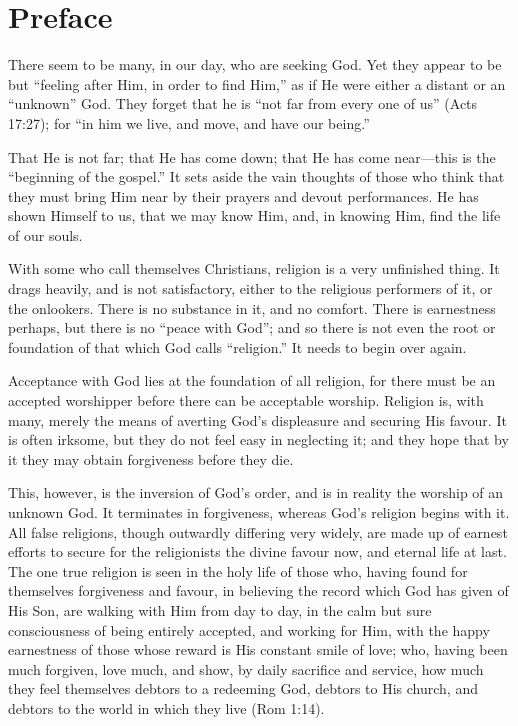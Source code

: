 \documentclass[
]{book}
\begin{document}
\clearpage
\setcounter{page}{1}

\hypertarget{preface}{%
\chapter*{Preface}\label{preface}}

There seem to be many, in our day, who are seeking God. Yet they appear to be but ``feeling after Him, in order to find Him,'' as if He were either a distant or an ``unknown'' God. They forget that he is ``not far from every one of us'' (Acts 17:27); for ``in him we live, and move, and have our being.''

That He is not far; that He has come down; that He has come near---this is the ``beginning of the gospel.'' It sets aside the vain thoughts of those who think that they must bring Him near by their prayers and devout performances. He has shown Himself to us, that we may know Him, and, in knowing Him, find the life of our souls.

With some who call themselves Christians, religion is a very unfinished thing. It drags heavily, and is not satisfactory, either to the religious performers of it, or the onlookers. There is no substance in it, and no comfort. There is earnestness perhaps, but there is no ``peace with God''; and so there is not even the root or foundation of that which God calls ``religion.'' It needs to begin over again.

Acceptance with God lies at the foundation of all religion, for there must be an accepted worshipper before there can be acceptable worship. Religion is, with many, merely the means of averting God's displeasure and securing His favour. It is often irksome, but they do not feel easy in neglecting it; and they hope that by it they may obtain forgiveness before they die.

This, however, is the inversion of God's order, and is in reality the worship of an unknown God. It terminates in forgiveness, whereas God's religion begins with it. All false religions, though outwardly differing very widely, are made up of earnest efforts to secure for the religionists the divine favour now, and eternal life at last. The one true religion is seen in the holy life of those who, having found for themselves forgiveness and favour, in believing the record which God has given of His Son, are walking with Him from day to day, in the calm but sure consciousness of being entirely accepted, and working for Him, with the happy earnestness of those whose reward is His constant smile of love; who, having been much forgiven, love much, and show, by daily sacrifice and service, how much they feel themselves debtors to a redeeming God, debtors to His church, and debtors to the world in which they live (Rom 1:14).
\end{document}
